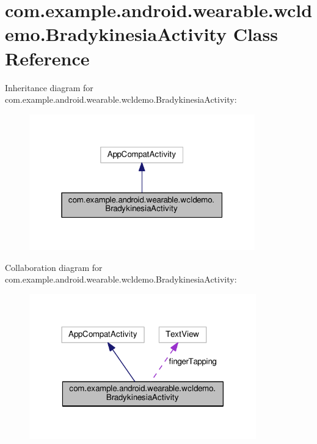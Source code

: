 \hypertarget{classcom_1_1example_1_1android_1_1wearable_1_1wcldemo_1_1BradykinesiaActivity}{}\section{com.\+example.\+android.\+wearable.\+wcldemo.\+Bradykinesia\+Activity Class Reference}
\label{classcom_1_1example_1_1android_1_1wearable_1_1wcldemo_1_1BradykinesiaActivity}


Inheritance diagram for com.\+example.\+android.\+wearable.\+wcldemo.\+Bradykinesia\+Activity\+:\nopagebreak
\begin{figure}[H]
\begin{center}
\leavevmode
\includegraphics[width=277pt]{d1/dfc/classcom_1_1example_1_1android_1_1wearable_1_1wcldemo_1_1BradykinesiaActivity__inherit__graph}
\end{center}
\end{figure}


Collaboration diagram for com.\+example.\+android.\+wearable.\+wcldemo.\+Bradykinesia\+Activity\+:\nopagebreak
\begin{figure}[H]
\begin{center}
\leavevmode
\includegraphics[width=278pt]{da/d98/classcom_1_1example_1_1android_1_1wearable_1_1wcldemo_1_1BradykinesiaActivity__coll__graph}
\end{center}
\end{figure}
